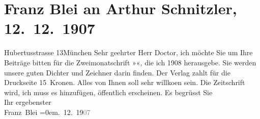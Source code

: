 

               \section[Franz Blei an Arthur Schnitzler, 12. 12. 1907]{ Franz Blei an Arthur Schnitzler, 12. 12. 1907}\nopagebreak{}\rehead{ }\begin{ledgroupsized}[t]{13cm}\normalsize\beginnumbering{} \toendnotes[C]{\smallbreak\pagebreak[2]} 
\toendnotes[C]{\smallbreak}\pstart
           \noindent{}{\pb}Hubertusstrasse{ }13\hspace*{1.5em}München\pend
           \pstart{}Sehr geehrter Herr Doctor,\pend\pstart
           ich möchte Sie um Ihre Beiträge bitten für die Zweimonatschrift »\label{K_L01740_1v}\label{K_L01740_1h}«, die ich 1908
                    herausgebe. Sie werden unsere guten Dichter und Zeichner darin finden. Der
                    Verlag zahlt für die Druckseite 15 Kronen. Alles von Ihnen soll sehr willko{\geminationm}en sein. Die Zeitschrift wird, ich muss es
                    hinzufügen, öffentlich erscheinen.\pend
           \pstart
           Es begrüsst Sie{\\[\baselineskip]}Ihr ergebenster{\\[\baselineskip]}\spacefill\mbox{Franz Blei}\pend
           \leftskip=0em{}. 12. 19\textcolor{gray}{07}\pend
           \endnumbering{}\end{ledgroupsized}  \newcommand{\dateiname}{L01740}\newcommand{\titel}{Franz Blei an Arthur Schnitzler, 12. 12. 1907}\newcommand{\editorInnen}{Martin Anton Müller und Gerd-Hermann Susen}
            \footnotesize
\begin{ledgroupsized}[t]{11.5cm}
\end{ledgroupsized}
         
      